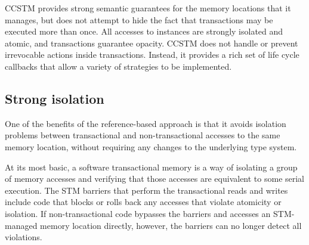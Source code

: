 
CCSTM provides strong semantic guarantees for the memory locations that it
manages, but does not attempt to hide the fact that transactions may be
executed more than once.  All accesses to  instances are strongly
isolated and atomic, and transactions guarantee opacity.  CCSTM does not
handle or prevent irrevocable actions inside transactions.  Instead, it provides a
rich set of life cycle callbacks that allow a variety of strategies to be
implemented.

\subsection{Strong isolation}

One of the benefits of the reference-based approach is that it avoids
isolation problems between transactional and non-transactional accesses to
the same memory location, without requiring any changes to the underlying
type system.

At its most basic, a software transactional memory is a way of isolating a
group of memory accesses and verifying that those accesses are equivalent
to some serial execution.  The STM barriers that perform the transactional
reads and writes include code that blocks or rolls back any accesses that
violate atomicity or isolation.  If non-transactional code bypasses the
barriers and accesses an STM-managed memory location directly, however,
the barriers can no longer detect all violations.

